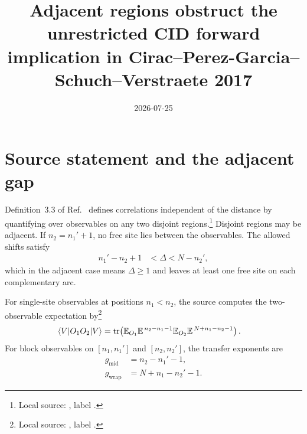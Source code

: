 \documentclass{article}
\title{Adjacent regions obstruct the unrestricted CID forward implication in
Cirac--Perez-Garcia--Schuch--Verstraete 2017}
\author{}
\date{2026-07-25}
\begin{document}
\maketitle
{}

\section{Source statement and the adjacent gap}

Definition~3.3 of Ref.~\cite{Cirac2016MPDO_arXiv} defines correlations
independent of the distance by quantifying over observables on any two
disjoint regions.\footnote{Local source:
, label .}
Disjoint regions may be adjacent. If $n_2=n_1'+1$, no free site lies between
the observables. The allowed shifts satisfy
\begin{align}
    n_1'-n_2+1
        &<\Delta<N-n_2',
    \label{eq:cpsv16_pure_zcl_adjacent_gap_cid_scope_allowed_shift_interval}
\end{align}
which in the adjacent case means $\Delta\geq 1$ and leaves at least one free
site on each complementary arc.

For single-site observables at positions $n_1<n_2$, the source computes the
two-observable expectation by\footnote{Local source:
, label .}
\begin{align}
    \langle V|O_1O_2|V\rangle
        &=\operatorname{tr}\!\left(\mathbb E_{O_1}
          \mathbb E^{\,n_2-n_1-1}
          \mathbb E_{O_2}
          \mathbb E^{\,N+n_1-n_2-1}\right).
    \label{eq:cpsv16_pure_zcl_adjacent_gap_cid_scope_single_site_trace_formula}
\end{align}
For block observables on $[n_1,n_1']$ and $[n_2,n_2']$, the transfer exponents
are
\begin{align}
    g_{\mathrm{mid}}
        &=n_2-n_1'-1,
    \label{eq:cpsv16_pure_zcl_adjacent_gap_cid_scope_middle_gap}\\
    g_{\mathrm{wrap}}
        &=N+n_1-n_2'-1.
    \label{eq:cpsv16_pure_zcl_adjacent_gap_cid_scope_wrapping_gap}
\end{align}
\end{document}
